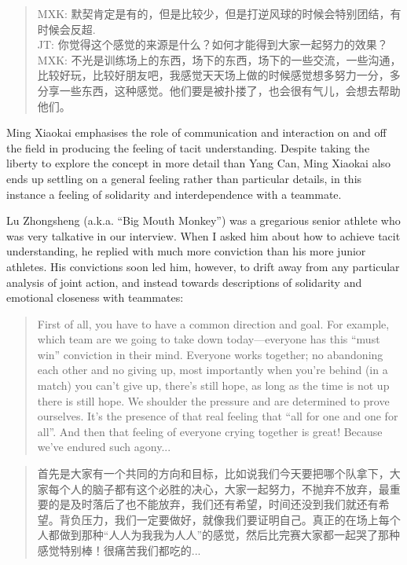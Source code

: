 \begin{CJK}{UTF8}{gbsn}
    \begin{quote}
        MXK: 默契肯定是有的，但是比较少，但是打逆风球的时候会特别团结，有时候会反超. \\
        JT: 你觉得这个感觉的来源是什么？如何才能得到大家一起努力的效果？ \\
        MXK: 不光是训练场上的东西，场下的东西，场下的一些交流，一些沟通，比较好玩，比较好朋友吧，我感觉天天场上做的时候感觉想多努力一分，多分享一些东西，这种感觉。他们要是被扑搂了，也会很有气儿，会想去帮助他们。 
    \end{quote}

Ming Xiaokai emphasises the role of communication and interaction on and off the field in producing the feeling of tacit understanding.  Despite taking the liberty to explore the concept in more detail than Yang Can, Ming Xiaokai also ends up settling on a general feeling rather than particular details, in this instance a feeling of solidarity and interdependence with a teammate.

Lu Zhongsheng (a.k.a. ``Big Mouth Monkey'') was a gregarious senior athlete who was very talkative in our interview.  When I asked him about how to achieve tacit understanding, he replied with much more conviction than his more junior athletes.  His convictions soon led him, however, to drift away from any particular analysis of joint action, and instead towards descriptions of solidarity and emotional closeness with teammates:

    \begin{quote}
      First of all, you have to have a common direction and goal.  For example, which team are we going to take down today---everyone has this ``must win'' conviction in their mind.  Everyone works together; no abandoning each other and no giving up, most importantly when you’re behind (in a match) you can’t give up, there’s still hope, as long as the time is not up there is still hope.  We shoulder the pressure and are determined to prove ourselves.  It's the presence of that real feeling that ``all for one and one for all''.  And then that feeling of everyone crying together is great! Because we've endured such agony...
    \end{quote}

    \begin{quote}
      首先是大家有一个共同的方向和目标，比如说我们今天要把哪个队拿下，大家每个人的脑子都有这个必胜的决心，大家一起努力，不抛弃不放弃，最重要的是及时落后了也不能放弃，我们还有希望，时间还没到我们就还有希望。背负压力，我们一定要做好，就像我们要证明自己。真正的在场上每个人都做到那种“人人为我我为人人”的感觉，然后比完赛大家都一起哭了那种感觉特别棒！很痛苦我们都吃的...
    \end{quote}



\end{CJK}
